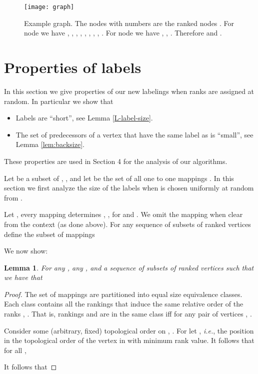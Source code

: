 \documentclass[11pt]{article}
\theoremstyle{plain}
\newtheorem{lem}[thm]{Lemma}
\theoremstyle{definition}
\theoremstyle{remark}
\numberwithin{equation}{section}
\begin{document}
\begin{figure}[t]
\centering
\ifpdf
\texttt{[image: graph]}
\else
{}
\fi

\caption{Example graph. The nodes with numbers are the ranked nodes .  For node  we have , , , , , ,  , , .  For node  we have , , .
Therefore  and . \label{graph:fig}}
\end{figure}

\section{Properties of labels}  \label{labels:sec}

In this section we give properties of our new labelings when ranks are assigned at random. In particular we show that
\begin{itemize}
  \item Labels are ``short'', see Lemma \ref{L-label-size}.
  \item The set of predecessors of a vertex  that have the same label as  is ``small'', see Lemma \ref{lem:backsize}.
\end{itemize}
These properties are used in Section 4 for the analysis of our algorithms.


Let  be a subset of , , and let  be
the set of all one to one mappings . In this section we first analyze the size of
the labels when  is chosen uniformly at random from .

Let , every mapping  determines  ,
,  for  and . We omit the mapping 
when clear from the context (as done above). For any sequence of
subsets of ranked vertices    define the subset
of mappings


We now show:
\begin{lem}\label{L-set-size} For any  , any ,
 and a sequence of
subsets of ranked vertices     such that
 we have that

\end{lem}
\begin{proof}
 The set of mappings  are partitioned into
  equal size equivalence classes. Each class
contains  all the rankings that induce the same
 relative order of the ranks
, . That is,  rankings  and  are in
the same class  iff for any pair of vertices ,
.

Consider some (arbitrary, fixed) topological order on ,
. For  let , {\sl i.e.}, the
position in the topological order of the vertex in  with minimum rank value.
It follows that for all ,
   

It follows that
  
\end{proof}
\end{document}
